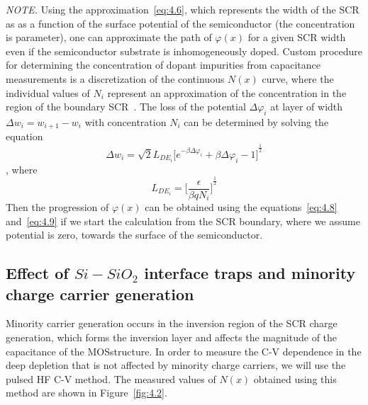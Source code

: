 \begin{minipage}[c]{\textwidth}
  \emph{NOTE.} Using the approximation~\ref{eq:4.6}, which represents
  the width of the SCR as as a function of the surface potential of
  the semiconductor (the concentration is parameter), one can
  approximate the path of $\varphi(x)$ for a given SCR width even if
  the semiconductor substrate is inhomogeneously doped.  Custom
  procedure for determining the concentration of dopant impurities
  from capacitance measurements is a discretization of the continuous
  $N(x)$ curve, where the individual values of $N_i$ represent an
  approximation of the concentration in the region of the boundary
  SCR~\cite{4.1, 4.2, 4.3}.  The loss of the potential
  $\Delta\varphi_i$ at layer of width $\Delta w_{i}=w_{i+1}-w_{i}$
  with concentration $N_i$ can be determined by solving the equation
  \begin{equation}\label{eq:4.8}
    \Delta w_{i} = \sqrt{2}L_{DE_{i}}{\Big[e^{-\beta\Delta\varphi_{i}} + \beta\Delta\varphi_{i} - 1\Big]}^{\frac{1}{2}}
  \end{equation}
  , where%
  \begin{equation}\label{eq:4.9}
    L_{DE_{i}} = {\bigg[\frac{\epsilon}{\beta qN_{i}}\bigg]}^{\frac{1}{2}}
  \end{equation}
  Then the progression of $\varphi(x)$ can be obtained using the
  equations~\ref{eq:4.8} and~\ref{eq:4.9} if we start the calculation
  from the SCR boundary, where we assume potential is zero, towards
  the surface of the semiconductor.
\end{minipage}

\subsection[Effect of $Si-SiO_{2}$ interface traps and minority charge carrier generation]{Effect of $Si-SiO_{2}$ interface traps and minority charge carrier generation}\label{sec:4.1.3}

Minority carrier generation occurs in the inversion region of the SCR
charge generation, which forms the inversion layer and affects the
magnitude of the capacitance of the MOS\@ structure. In order to
measure the C-V dependence in the deep depletion that is not affected
by minority charge carriers, we will use the pulsed HF C-V method. The
measured values of $N(x)$ obtained using this method are shown in
Figure~\ref{fig:4.2}.

